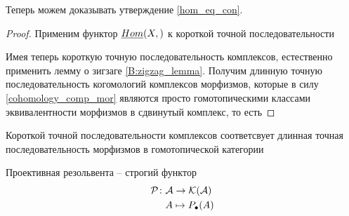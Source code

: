 \documentclass[../main.tex]{subfiles}
\begin{document}
Теперь можем доказывать утверждение \ref{hom_eq_con}.
\begin{proof}
Применим функтор $\underline{Hom}(X,)$ к короткой точной последовательности
\bee\label{3:cone_short_exact_eq}
\eee
\bee
{}
\eee
Имея теперь короткую точную последовательность комплексов, естественно применить лемму о зигзаге \ref{B:zigzag_lemma}. Получим длинную точную последовательность когомологий комплексов морфизмов, которые в силу \ref{cohomology_comp_mor} являются просто гомотопическими классами эквивалентности морфизмов в сдвинутый комплекс, то есть
\bee
{}
\eee
\end{proof}
\begin{to_lem}
    Короткой точной последовательности комплексов соответсвует длинная точная последовательность морфизмов в гомотопической категории
    \bee
{}
    \eee
\bee
{}
    \eee
\end{to_lem}
\begin{to_suj}\label{tactics}
    Проективная резольвента -- строгий функтор
    \begin{align*}
        \mathcal{P}\colon&\mathcal{A} \to\mathcal{K(A)}\\
         &A \mapsto P_\bullet(A)
    \end{align*}
\end{to_suj}
\end{document}
